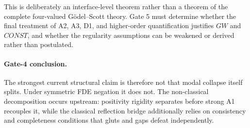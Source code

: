 This is deliberately an interface-level theorem rather than a theorem of the complete four-valued Gödel--Scott theory. Gate 5 must determine whether the final treatment of A2, A3, D1, and higher-order quantification justifies \(GW\) and \(CONST\), and whether the regularity assumptions can be weakened or derived rather than postulated.

\paragraph{Gate-4 conclusion.}
The strongest current structural claim is therefore not that modal collapse itself splits. Under symmetric FDE negation it does not. The non-classical decomposition occurs upstream: positivity rigidity separates before strong A1 recouples it, while the classical reflection bridge additionally relies on consistency and completeness conditions that gluts and gaps defeat independently.
